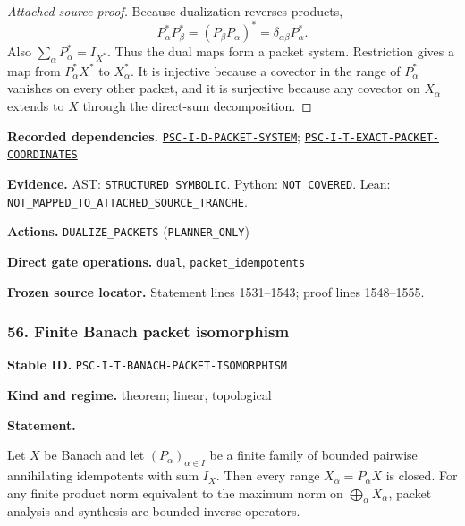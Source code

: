 \documentclass[a4paper,11pt]{article}
\newcommand{\field}[2]{\noindent\textbf{#1.} #2\par}
\begin{document}
\begin{proof}[Attached source proof]
Because dualization reverses products,
\[
P_\alpha^*P_\beta^*=(P_\beta P_\alpha)^*
=\delta_{\alpha\beta}P_\alpha^*.
\]
Also \(\sum_\alpha P_\alpha^*=I_{X^*}\).  Thus the dual maps form a packet system.  Restriction gives a map from \(P_\alpha^*X^*\) to \(X_\alpha^*\).  It is injective because a covector in the range of \(P_\alpha^*\) vanishes on every other packet, and it is surjective because any covector on \(X_\alpha\) extends to \(X\) through the direct-sum decomposition.
\end{proof}
\field{Recorded dependencies}{\hyperref[rec:PSC-I-D-PACKET-SYSTEM]{\nolinkurl{PSC-I-D-PACKET-SYSTEM}}; \hyperref[rec:PSC-I-T-EXACT-PACKET-COORDINATES]{\nolinkurl{PSC-I-T-EXACT-PACKET-COORDINATES}}}
\field{Evidence}{AST: \nolinkurl{STRUCTURED_SYMBOLIC}. Python: \nolinkurl{NOT_COVERED}. Lean: \nolinkurl{NOT_MAPPED_TO_ATTACHED_SOURCE_TRANCHE}.}
\field{Actions}{\nolinkurl{DUALIZE_PACKETS} (\nolinkurl{PLANNER_ONLY})}
\field{Direct gate operations}{\nolinkurl{dual}, \nolinkurl{packet_idempotents}}
\field{Frozen source locator}{Statement lines 1531--1543; proof lines 1548--1555.}
\subsubsection*{56. Finite Banach packet isomorphism}
\label{rec:PSC-I-T-BANACH-PACKET-ISOMORPHISM}
\field{Stable ID}{\nolinkurl{PSC-I-T-BANACH-PACKET-ISOMORPHISM}}
\field{Kind and regime}{theorem; linear, topological}
\textbf{Statement.}\par
Let $X$ be Banach and let $(P_\alpha)_{\alpha\in I}$ be a finite family of bounded pairwise annihilating idempotents with sum $I_X$.  Then every range $X_\alpha=P_\alpha X$ is closed.  For any finite product norm equivalent to the maximum norm on $\bigoplus_\alpha X_\alpha$, packet analysis and synthesis are bounded inverse operators.
\end{document}

